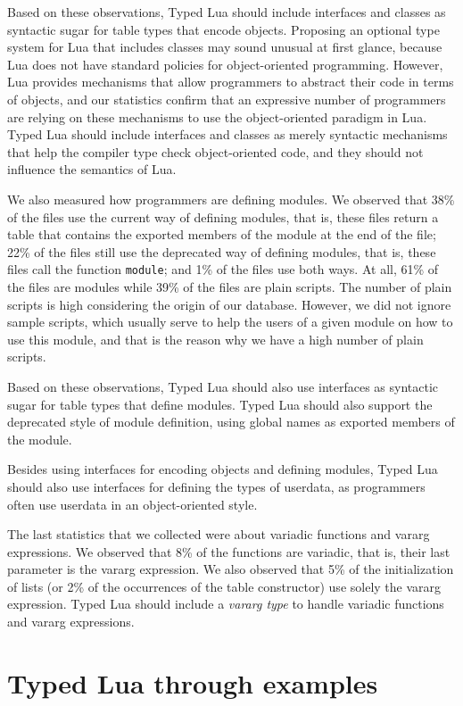 Based on these observations, Typed Lua should include interfaces and
classes as syntactic sugar for table types that encode objects.
Proposing an optional type system for Lua that includes classes may
sound unusual at first glance, because Lua does not have standard
policies for object-oriented programming.
However, Lua provides mechanisms that allow programmers to abstract
their code in terms of objects, and our statistics confirm that
an expressive number of programmers are relying on these mechanisms to
use the object-oriented paradigm in Lua.
Typed Lua should include interfaces and classes as merely syntactic
mechanisms that help the compiler type check object-oriented code,
and they should not influence the semantics of Lua.

We also measured how programmers are defining modules.
We observed that 38\% of the files use the current way of defining
modules, that is, these files return a table that contains the
exported members of the module at the end of the file;
22\% of the files still use the deprecated way of defining modules,
that is, these files call the function \texttt{module};
and 1\% of the files use both ways.
At all, 61\% of the files are modules while 39\% of the files are
plain scripts.
The number of plain scripts is high considering the origin of
our database.
However, we did not ignore sample scripts, which usually serve to
help the users of a given module on how to use this module, and
that is the reason why we have a high number of plain scripts.

Based on these observations, Typed Lua should also use interfaces as
syntactic sugar for table types that define modules.
Typed Lua should also support the deprecated style of module
definition, using global names as exported members of the module.

Besides using interfaces for encoding objects and defining modules,
Typed Lua should also use interfaces for defining the types of
userdata, as programmers often use userdata in an object-oriented
style.

The last statistics that we collected were about variadic functions
and vararg expressions.
We observed that 8\% of the functions are variadic, that is,
their last parameter is the vararg expression.
We also observed that 5\% of the initialization of lists
(or 2\% of the occurrences of the table constructor) use solely the
vararg expression.
Typed Lua should include a \emph{vararg type} to handle variadic
functions and vararg expressions.

\section{Typed Lua through examples}

